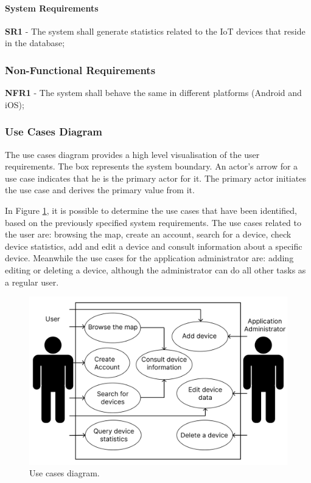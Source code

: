 \paragraph{System Requirements}

\textbf{SR1} - The system shall generate statistics related to the IoT devices that reside in the database;

\subsubsection{Non-Functional Requirements}

\textbf{NFR1} - The system shall behave the same in different platforms (Android and iOS);

\subsubsection{Use Cases Diagram}

The use cases diagram \cite{wiegers2013software} provides a high level visualisation of the user
requirements. The box represents the system boundary. An actor's arrow
for a use case indicates that he is the primary actor for it.
The primary actor initiates the use case and derives the primary value
from it.

In Figure \ref{fig:use_cases_diagram}, it is possible to determine the use cases
that have been identified, based on the previously specified system requirements.
The use cases related to the user are: browsing the map, create an account, search for
a device, check device statistics, add and edit a device and consult information
about a specific device. Meanwhile the use cases for the application administrator are:
adding editing or deleting a device, although the administrator can do all other
tasks as a regular user.

\begin{figure}[H]
    \centering
    \includegraphics[width=15cm]{../app/docs/software_requirements/assets/images/use_cases_diagram.png}
    \caption{Use cases diagram.}
    \label{fig:use_cases_diagram}
\end{figure}

